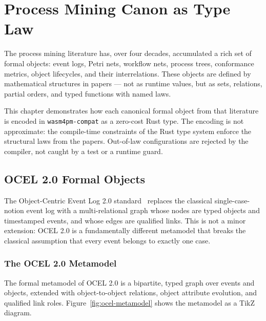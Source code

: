 \chapter{Process Mining Canon as Type Law}
\label{ch:processcanon}

The process mining literature has, over four decades, accumulated a rich set of formal
objects: event logs, Petri nets, workflow nets, process trees, conformance metrics, object
lifecycles, and their interrelations. These objects are defined by mathematical structures
in papers --- not as runtime values, but as sets, relations, partial orders, and typed
functions with named laws.

This chapter demonstrates how each canonical formal object from that literature is encoded
in \texttt{wasm4pm-compat} as a zero-cost Rust type. The encoding is not approximate: the
compile-time constraints of the Rust type system enforce the structural laws from the
papers. Out-of-law configurations are rejected by the compiler, not caught by a test or a
runtime guard.

\section{OCEL 2.0 Formal Objects}
\label{sec:canon-ocel}

The Object-Centric Event Log 2.0 standard~\cite{ghahfarokhi2021ocel,berti2023ocel20}
replaces the classical single-case-notion event log with a multi-relational graph whose
nodes are typed objects and timestamped events, and whose edges are qualified links. This
is not a minor extension: OCEL 2.0 is a fundamentally different metamodel that breaks the
classical assumption that every event belongs to exactly one case.

\subsection{The OCEL 2.0 Metamodel}

The formal metamodel of OCEL 2.0 is a bipartite, typed graph over events and objects,
extended with object-to-object relations, object attribute evolution, and qualified link
roles. Figure~\ref{fig:ocel-metamodel} shows the metamodel as a TikZ diagram.

